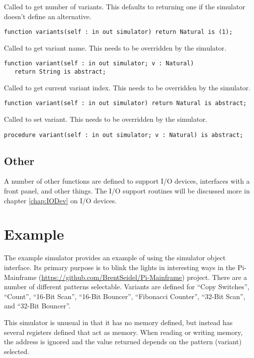 \documentclass[10pt, openany]{book}
\begin{document}
Called to get number of variants.  This defaults to returning one if the simulator doesn't define an alternative.
\begin{lstlisting}
function variants(self : in out simulator) return Natural is (1);
\end{lstlisting}
Called to get variant name.  This needs to be overridden by the simulator.
\begin{lstlisting}
function variant(self : in out simulator; v : Natural)
   return String is abstract;
\end{lstlisting}
Called to get current variant index.  This needs to be overridden by the simulator.
\begin{lstlisting}
function variant(self : in out simulator) return Natural is abstract;
\end{lstlisting}
Called to set variant.  This needs to be overridden by the simulator.
\begin{lstlisting}
procedure variant(self : in out simulator; v : Natural) is abstract;
\end{lstlisting}

\subsection{Other}
A number of other functions are defined to support I/O devices, interfaces with a front panel, and other things.  The I/O support routines will be discussed more in chapter \ref{chap:IODev} on I/O devices.
\section{Example}
The example simulator provides an example of using the simulator object interface.  Its primary purpose is to blink the lights in interesting ways in the Pi-Mainframe (\url{https://github.com/BrentSeidel/Pi-Mainframe}) project.  There are a number of different patterns selectable.  Variants are defined for ``Copy Switches'', ``Count'', ``16-Bit Scan'', ``16-Bit Bouncer'', ``Fibonacci Counter'', ``32-Bit Scan'', and ``32-Bit Bouncer''.

This simulator is unusual in that it has no memory defined, but instead has several registers defined that act as memory.  When reading or writing memory, the address is ignored and the value returned depends on the pattern (variant) selected.

\end{document}

